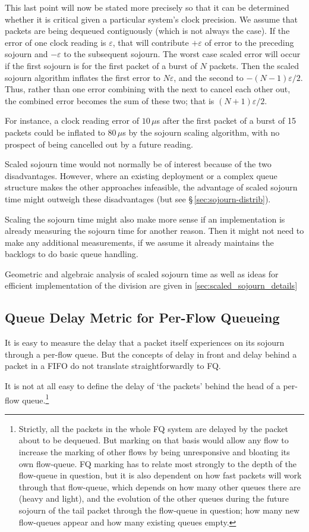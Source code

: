 This last point will now be stated more precisely so that it can be determined whether it is critical given a particular system's clock precision. We assume that packets are being dequeued contiguously (which is not always the case). If the error of one clock reading is \(\varepsilon\), that will contribute \(+\varepsilon\) of error to the preceding sojourn and \(-\varepsilon\) to the subsequent sojourn. The worst case scaled error will occur if the first sojourn is for the first packet of a burst of \(N\) packets. Then the scaled sojourn algorithm inflates the first error to \(N\varepsilon\), and the second to \(-(N-1)\varepsilon/2\). Thus, rather than one error combining with the next to cancel each other out, the combined error becomes the sum of these two; that is \((N+1)\varepsilon/2\).

For instance, a clock reading error of \(10\,\mu\)s after the first packet of a burst of 15 packets could be inflated to \(80\,\mu\)s by the sojourn scaling algorithm, with no prospect of being cancelled out by a future reading.

Scaled sojourn time would not normally be of interest because of the two disadvantages. However, where an existing deployment or a complex queue structure makes the other approaches infeasible, the advantage of scaled sojourn time might outweigh these disadvantages (but see \S\,\ref{sec:sojourn-distrib}).

Scaling the sojourn time might also make more sense if an implementation is already measuring the sojourn time for another reason. Then it might not need to make any additional measurements, if we assume it already maintains the backlogs to do basic queue handling.

Geometric and algebraic analysis of scaled sojourn time as well as ideas for efficient implementation of the division are given in \autoref{sec:scaled_sojourn_details}

\subsection{Queue Delay Metric for Per-Flow Queueing}\label{sec:fq_delay_metric}

It is easy to measure the delay that a packet itself experiences on its sojourn through a per-flow queue. But the concepts of delay in front and delay behind a packet in a FIFO do not translate straightforwardly to FQ.

It is not at all easy to define the delay of `the packets' behind the head of a per-flow queue.\footnote{Strictly, all the packets in the whole FQ system are delayed by the packet about to be dequeued. But marking on that basis would allow any flow to increase the marking of other flows by being unresponsive and bloating its own flow-queue. FQ marking has to relate most strongly to the depth of the flow-queue in question, but it is also dependent on how fast packets will work through that flow-queue, which depends on how many other queues there are (heavy and light), and the evolution of the other queues during the future sojourn of the tail packet through the flow-queue in question; how many new flow-queues appear and how many existing queues empty.}

